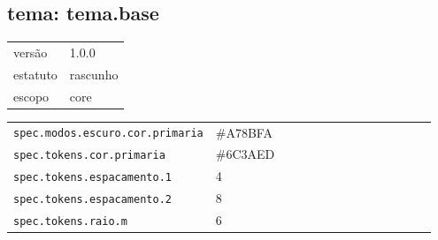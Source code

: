 \subsection*{tema: tema.base}
\begin{tabular}{@{}ll@{}}
versão & 1.0.0 \\
estatuto & rascunho \\
escopo & core \\
\end{tabular}

\begin{tabular}{@{}p{0.35\linewidth}p{0.6\linewidth}@{}}
\texttt{spec.modos.escuro.cor.primaria} & \#A78BFA \\
\texttt{spec.tokens.cor.primaria} & \#6C3AED \\
\texttt{spec.tokens.espacamento.1} & 4 \\
\texttt{spec.tokens.espacamento.2} & 8 \\
\texttt{spec.tokens.raio.m} & 6 \\
\end{tabular}
